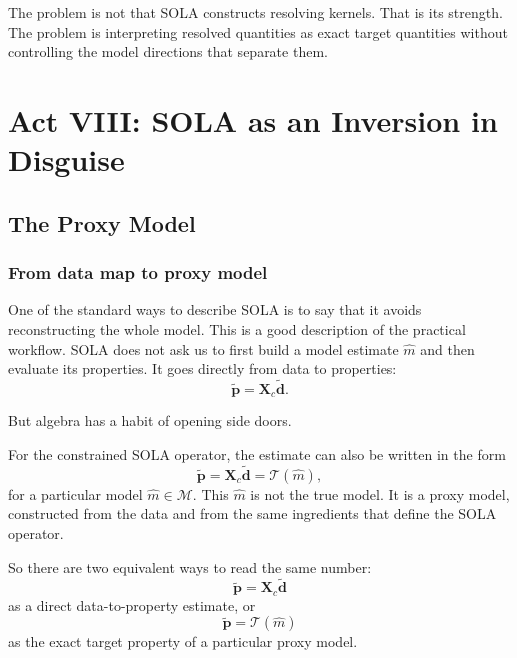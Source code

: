 \documentclass[11pt,openany]{book}
\theoremstyle{definition}
\theoremstyle{remark}
\newcommand{\M}{\mathcal M}
\newcommand{\Tau}{\mathcal{T}}
\begin{document}
\begin{lessonbox}
The problem is not that SOLA constructs resolving kernels. That is its strength. The problem is
interpreting resolved quantities as exact target quantities without controlling the model
directions that separate them.
\end{lessonbox}



\part{Act VIII: SOLA as an Inversion in Disguise}

\chapter{The Proxy Model}

\section{From data map to proxy model}

One of the standard ways to describe SOLA is to say that it avoids reconstructing the whole
model. This is a good description of the practical workflow. SOLA does not ask us to first build
a model estimate \(\hat m\) and then evaluate its properties. It goes directly from data to
properties:
\[
  \widetilde{\mathbf p}
  =
  \mathbf X_c\widetilde{\mathbf d}.
\]

But algebra has a habit of opening side doors.

For the constrained SOLA operator, the estimate can also be written in the form
\[
  \widetilde{\mathbf p}
  =
  \mathbf X_c\widetilde{\mathbf d}
  =
  \Tau(\hat m),
\]
for a particular model \(\hat m\in\M\). This \(\hat m\) is not the true model. It is a proxy model,
constructed from the data and from the same ingredients that define the SOLA operator.

So there are two equivalent ways to read the same number:
\[
  \widetilde{\mathbf p}
  =
  \mathbf X_c\widetilde{\mathbf d}
\]
as a direct data-to-property estimate, or
\[
  \widetilde{\mathbf p}
  =
  \Tau(\hat m)
\]
as the exact target property of a particular proxy model.
\end{document}
